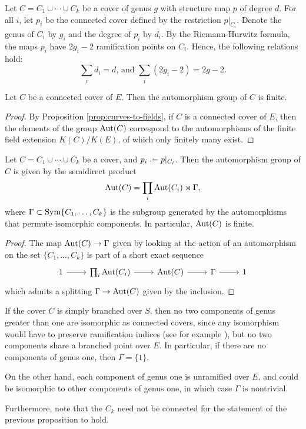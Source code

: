 \begin{rmk}
 Let $C=C_1 \cup \dotsb \cup C_k$ be a cover of genus $g$ with structure map $p$ of degree $d$. For all $i$, let $p_i$ be the connected cover defined by the restriction $p|_{C_i}$. Denote the genus of $C_i$ by $g_i$  and the degree of $p_i$ by $d_i$. By the Riemann-Hurwitz formula, the maps $p_i$ have $2g_i-2$ ramification points on $C_i$. Hence, the following relations hold:
 \[\sum_i d_i=d\text{, and }\sum_i (2g_i-2)=2g-2.\]
\end{rmk}

\begin{prop}
 Let $C$ be a connected cover of $E$. Then the automorphism group of $C$ is finite.
\end{prop}

\begin{proof}
 By Proposition \ref{prop:curves-to-fields}, if $C$ is a connected cover of $E$, then the elements of the group $\operatorname{Aut}(C)$ correspond to the automorphisms of the finite field extension $K(C)/K(E)$, of which only finitely many exist.
\end{proof}

\begin{prop} \label{pr:automorphism-group}
 Let $C=C_1 \cup \dotsb \cup C_k$ be a cover, and $p_i\defeq p|_{C_i}$. Then the automorphism group of $C$ is given by the semidirect product \[\operatorname{Aut}(C) = \prod_i \operatorname{Aut}(C_i) \rtimes \Gamma,\] where $\Gamma \subset \operatorname{Sym}\{C_1, \dotsc, C_k\}$ is the subgroup generated by the automorphisms that permute isomorphic components. In particular, $\operatorname{Aut}(C)$ is finite.
\end{prop}
 
\begin{proof}
 The map $\operatorname{Aut}(C) \to \Gamma$ given by looking at the action of an automorphism on the set $\{C_1,\dotsc,C_k\}$ is part of a short exact sequence \[\ses{1}{\prod_i \Aut(C_i)}{\Aut(C)}{\Gamma}{}{}\]
 which admits a splitting $\Gamma \to \operatorname{Aut}(C)$ given by the inclusion.
\end{proof}

\begin{rmk}
 If the cover $C$ is simply branched over $S$, then no two components of genus greater than one are isomorphic as connected covers, since any isomorphism would have to preserve ramification indices (see for example \cite[II, Prop. 2.6]{Silverman2009}), but no two components share a branched point over $E$. In particular, if there are no components of genus one, then $\Gamma=\{1\}$.
 
 On the other hand, each component of genus one is unramified over $E$, and could be isomorphic to other components of genus one, in which case $\Gamma$ is nontrivial.
 
 Furthermore, note that the $C_k$ need not be connected for the statement of the previous proposition to hold.
\end{rmk}

